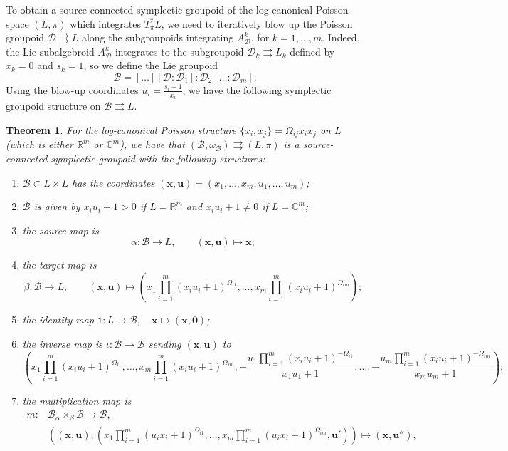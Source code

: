 \documentclass{amsart}
\newtheorem{theorem}{Theorem}[section]
\numberwithin{equation}{section}
\newcommand{\bfu}{{\boldsymbol{u}}}
\newcommand{\bfx}{{\boldsymbol{x}}}
\newcommand{\bfzero}{\mathbf{0}}
\newcommand{\cB}{\mathcal{B}}
\newcommand{\cD}{\mathcal{D}}
\newcommand{\CC}{\mathbb{C}}
\newcommand{\RR}{\mathbb{R}}
\newcommand{\rra}{\rightrightarrows}
\begin{document}
To obtain a source-connected symplectic groupoid of the log-canonical Poisson space $(L, \pi)$ which integrates $T^*_\pi L$, we need to iteratively blow up the Poisson groupoid $\cD \rra L$ along the subgroupoids integrating $A_\cD^k$, for $k =1, \ldots, m$.
Indeed, the Lie subalgebroid $A_\cD^k$ integrates to the subgroupoid $\cD_k \rra L_k$ defined by $x_k=0$ and $s_k=1$, so we define the Lie groupoid
\[\cB = [\ldots[[\cD\!:\!\cD_1]\!:\!\cD_2] \ldots \!:\!\cD_m].\]
Using the blow-up coordinates $u_i = \frac{s_i-1}{x_i}$, we have the following symplectic groupoid structure on $\cB \rra L$.
\begin{theorem} 
  \label{th:blowup groupoid}
  For the log-canonical Poisson structure $\{x_i, x_j\} = \Omega_{ij} x_i x_j$ on $L$ (which is either $\RR^m$ or $\CC^m$), we have that $(\cB, \omega_\cB) \rra (L, \pi)$ is a source-connected symplectic groupoid with the following structures:
  \begin{enumerate}
    \item $\cB \subset L \times L$ has the coordinates $(\bfx, \bfu) = (x_1, \ldots, x_m, u_1, \ldots, u_m)$;
    \item $\cB$ is given by $x_i u_i + 1 > 0$ if $L = \RR^m$ and $x_i u_i + 1\ne 0$ if $L = \CC^m$;
    \item the source map is
      \[\alpha: \cB \to L, \qquad (\bfx, \bfu) \mapsto \bfx;\]
    \item the target map is
      \[\beta: \cB \to L, \qquad (\bfx, \bfu) \mapsto \left(x_1 \prod_{i=1}^m (x_iu_i+1)^{\Omega_{i1}}, \ldots, x_m \prod_{i=1}^m (x_iu_i+1)^{\Omega_{im}}\right);\]
	\item the identity map $\mathtt{1}: L \to \cB, \quad \bfx \mapsto (\bfx, \bfzero)$;
    \item the inverse map is $\iota: \cB \to \cB$ sending $(\bfx, \bfu)$ to 
      \[\left(x_1 \prod_{i=1}^m (x_iu_i+1)^{\Omega_{i1}}, \ldots, x_m \prod_{i=1}^m (x_iu_i+1)^{\Omega_{im}}, -\frac{u_1\prod_{i=1}^m (x_iu_i+1)^{-\Omega_{i1}}}{x_1u_1+1}, \ldots, -\frac{u_m\prod_{i=1}^m (x_iu_i+1)^{-\Omega_{im}}}{x_mu_m+1}\right);\]
    \item the multiplication map is
      \[\begin{aligned}
	  m: & \cB {_\alpha \times_\beta} \cB \to \cB, \\
	     & \left((\bfx, \bfu), \left(x_1 \prod_{i=1}^m (u_ix_i+1)^{\Omega_{i1}}, \ldots, x_m \prod_{i=1}^m (u_ix_i+1)^{\Omega_{im}}, \bfu'\right)\right) \mapsto (\bfx, \bfu''),
        \end{aligned}\]

\end{enumerate}
\end{theorem}
\end{document}

